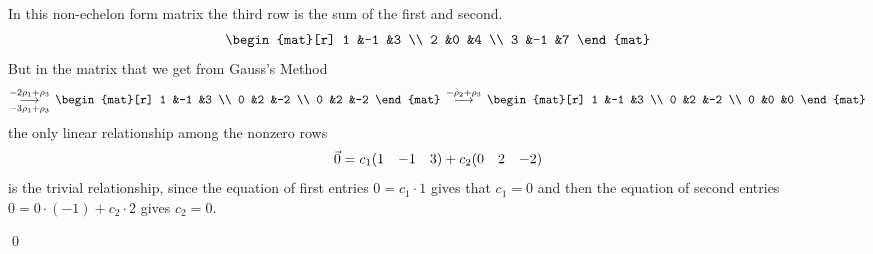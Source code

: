 \documentclass[10pt,t,serif,professionalfont]{beamer}
\begin{document}
\begin{frame}
\ex
In this non-echelon form matrix 
the third row is the sum of the first and second.
\begin{equation*}
  \begin{mat}[r]
    1  &-1  &3  \\
    2  &0   &4  \\
    3  &-1  &7
  \end{mat}
\end{equation*}
\pause
But in the matrix that we get from Gauss's Method
\begin{equation*}
  \grstep[-3\rho_1+\rho_3]{-2\rho_1+\rho_3}\,
  \begin{mat}[r]
    1  &-1  &3  \\
    0  &2   &-2  \\
    0  &2   &-2
  \end{mat}
  \,\grstep{-\rho_2+\rho_3}\,
  \begin{mat}[r]
    1  &-1  &3  \\
    0  &2   &-2  \\
    0  &0   &0
  \end{mat}
\end{equation*}
the only linear relationship among the nonzero rows
\begin{equation*}
  \vec{0}=c_1(\begin{matrix} 1 &-1 &3 \end{matrix}) 
        +c_2(\begin{matrix} 0 &2 &-2 \end{matrix})
\end{equation*}
is the trivial relationship,
since the equation of first entries $0=c_1\cdot 1$ gives that
$c_1=0$ and then the equation of second entries
$0=0\cdot (-1)+c_2\cdot 2$ gives $c_2=0$.
\end{frame}




\begin{frame}
\th[th:ReducedEchelonFormIsUnique]
\pause
\pf 
{}

\pause
{}

\pause
{}
\end{frame}\begin{frame}
\end{frame}\begin{frame}
\qed

\pause\medskip
{}
\end{frame}
\end{document}
